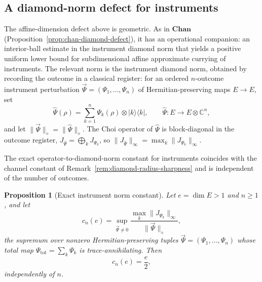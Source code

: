 \documentclass[11pt]{article}
\newtheorem{proposition}[theorem]{Proposition}
\begin{document}
\subsection{A diamond-norm defect for instruments}

The affine-dimension defect above is geometric. As in $\mathbf{Chan}$
(Proposition~\ref{prop:chan-diamond-defect}), it has an operational companion:
an interior-ball estimate in the instrument diamond norm that yields a positive
uniform lower bound for subdimensional affine approximate currying of
instruments. The relevant norm is the instrument diamond norm, obtained by
recording the outcome in a classical register: for an ordered $n$-outcome
instrument perturbation $\vec\Psi=(\Psi_1,\dots,\Psi_n)$ of
Hermitian-preserving maps $E\to E$, set
\[
\hat\Psi(\rho)=\sum_{k=1}^{n}\Psi_k(\rho)\otimes|k\rangle\langle k|,
\qquad
\hat\Psi:E\longrightarrow E\otimes\mathbb C^n,
\]
and let $\|\vec\Psi\|_\diamond=\|\hat\Psi\|_\diamond$. The Choi operator of
$\hat\Psi$ is block-diagonal in the outcome register,
$J_{\hat\Psi}=\bigoplus_k J_{\Psi_k}$, so
$\|J_{\hat\Psi}\|_\infty=\max_k\|J_{\Psi_k}\|_\infty$.

The exact operator-to-diamond-norm constant for instruments coincides with the
channel constant of Remark~\ref{rem:diamond-radius-sharpness} and is
independent of the number of outcomes.

\begin{proposition}[Exact instrument norm constant]
\label{prop:instr-cn}
Let $e=\dim E>1$ and $n\ge1$, and let
\[
c_n(e)=\sup_{\vec\Psi\neq0}
\frac{\max_k\|J_{\Psi_k}\|_\infty}{\|\vec\Psi\|_\diamond},
\]
the supremum over nonzero Hermitian-preserving tuples
$\vec\Psi=(\Psi_1,\dots,\Psi_n)$ whose total map
$\Psi_{\mathrm{tot}}=\sum_k\Psi_k$ is trace-annihilating. Then
\[
c_n(e)=\frac e2,
\]
independently of $n$.
\end{proposition}
\end{document}
